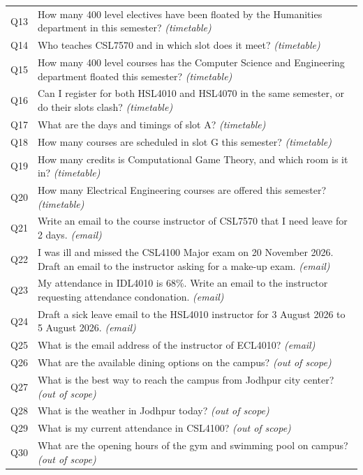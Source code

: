 \documentclass[10pt,a4paper]{article}
\begin{document}
\begin{longtable}{@{}>{\ttfamily}l p{}@{}}
Q13 & How many 400 level electives have been floated by the Humanities department in this semester? \textit{(timetable)}\\
Q14 & Who teaches CSL7570 and in which slot does it meet? \textit{(timetable)}\\
Q15 & How many 400 level courses has the Computer Science and Engineering department floated this semester? \textit{(timetable)}\\
Q16 & Can I register for both HSL4010 and HSL4070 in the same semester, or do their slots clash? \textit{(timetable)}\\
Q17 & What are the days and timings of slot A? \textit{(timetable)}\\
Q18 & How many courses are scheduled in slot G this semester? \textit{(timetable)}\\
Q19 & How many credits is Computational Game Theory, and which room is it in? \textit{(timetable)}\\
Q20 & How many Electrical Engineering courses are offered this semester? \textit{(timetable)}\\
Q21 & Write an email to the course instructor of CSL7570 that I need leave for 2 days. \textit{(email)}\\
Q22 & I was ill and missed the CSL4100 Major exam on 20 November 2026. Draft an email to the instructor asking for a make-up exam. \textit{(email)}\\
Q23 & My attendance in IDL4010 is 68\%. Write an email to the instructor requesting attendance condonation. \textit{(email)}\\
Q24 & Draft a sick leave email to the HSL4010 instructor for 3 August 2026 to 5 August 2026. \textit{(email)}\\
Q25 & What is the email address of the instructor of ECL4010? \textit{(email)}\\
Q26 & What are the available dining options on the campus? \textit{(out of scope)}\\
Q27 & What is the best way to reach the campus from Jodhpur city center? \textit{(out of scope)}\\
Q28 & What is the weather in Jodhpur today? \textit{(out of scope)}\\
Q29 & What is my current attendance in CSL4100? \textit{(out of scope)}\\
Q30 & What are the opening hours of the gym and swimming pool on campus? \textit{(out of scope)}\\
\bottomrule
\end{longtable}
\end{document}
